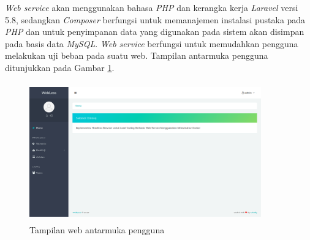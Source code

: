 			\indent \textit{Web service} akan menggunakan bahasa \textit{PHP} dan kerangka kerja \textit{Laravel} versi 5.8, sedangkan \textit{Composer} berfungsi untuk memanajemen instalasi pustaka pada \textit{PHP} dan untuk penyimpanan data yang digunakan pada sistem akan disimpan pada basis data \textit{MySQL}. \textit{Web service} berfungsi untuk memudahkan pengguna melakukan uji beban pada suatu web. Tampilan antarmuka pengguna ditunjukkan pada Gambar \ref{gambarweb}.
			
			\begin{figure}[H]
				\centering
				\includegraphics[width=10cm,height=6cm]{Images/C-4/gambarweb.png}
				\caption{Tampilan web antarmuka pengguna}
				\label{gambarweb}
			\end{figure}
			

